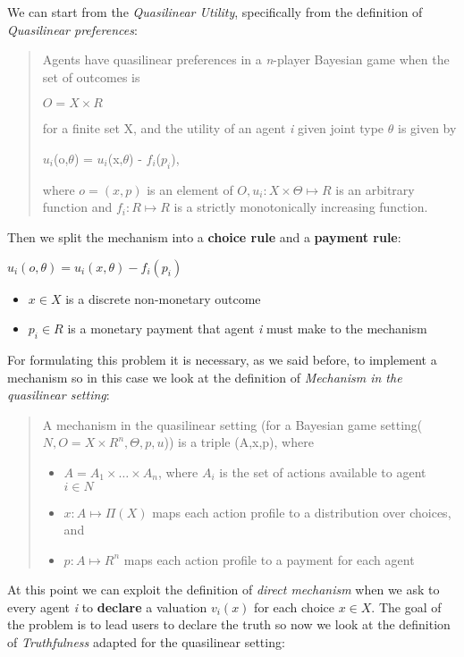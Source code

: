 \documentclass{article}
\begin{document}
\Large{
We can start from the \textit{Quasilinear Utility}, specifically from the definition of \textit{Quasilinear preferences}:
\begin{quote}
    Agents have quasilinear preferences in a \textit{n}-player Bayesian game when the set of outcomes is
    \begin{center}
        $O = X \times R$
    \end{center}
    for a finite set X, and the utility of an agent \textit{i} given joint type $\theta$ is given by
    \begin{center}
        $u_i$(o,$\theta$) = $u_i$(x,$\theta$) - $f_i$($p_i$),
    \end{center}
    where $o = (x,p)$ is an element of $O, u_i : X \times \Theta \mapsto R$ is an arbitrary function  and $f_i : R \mapsto R$ is a strictly monotonically increasing function.
\end{quote}
Then we split the mechanism into a \textbf{choice rule} and a \textbf{payment rule}:
\begin{center}
    $u_i(o,\theta) = u_i(x,\theta) - f_i(p_i)$
    \begin{itemize}
        \item $x \in X$ is a discrete non-monetary outcome
        \item $p_i \in R$ is a monetary payment that agent \textit{i} must make to the mechanism
    \end{itemize}
\end{center}
For formulating this problem it is necessary, as we said before, to implement a mechanism so in this case we look at the definition of \textit{Mechanism in the quasilinear setting}:
\begin{quote}
    A mechanism in the quasilinear setting (for a Bayesian game setting($N, O = X \times R^n, \Theta, p, u$)) is a triple (A,x,p), where
    \begin{itemize}
        \item $A = A_1 \times \dots \times A_n$, where $A_i$ is the set of actions available to agent $i \in N$
        \item $x : A \mapsto \Pi(X)$ maps each action profile to a distribution over choices, and
        \item $p : A \mapsto R^n$ maps each action profile to a payment for each agent
    \end{itemize}
\end{quote}
At this point we can exploit the definition of \textit{direct mechanism} when we ask to every agent \textit{i }to \textbf{declare} a valuation $v_i(x)$ for each choice $x \in X$. The goal of the problem is to lead users to declare the truth so now we look at the definition of \textit{Truthfulness} adapted for the quasilinear setting:
}
\end{document}
